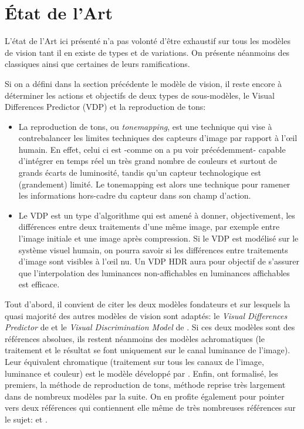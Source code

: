 	\chapter{État de l'Art}
	\par L'état de l'Art ici présenté n'a pas volonté d'être exhaustif sur tous les modèles de vision tant il en existe de types et de variations. On présente néanmoins des classiques ainsi que certaines de leurs ramifications.
	
	\par Si on a défini dans la section précédente le modèle de vision, il reste encore à déterminer les actions et objectifs de deux types de sous-modèles, le Visual Differences Predictor (VDP) et la reproduction de tons:
	\begin{itemize}
		\item La reproduction de tons, ou \textit{tonemapping}, est une technique qui vise à contrebalancer les limites techniques des capteurs d'image par rapport à l'œil humain. En effet, celui ci est -comme on a pu voir précédemment- capable d'intégrer en temps réel un très grand nombre de couleurs et surtout de grands écarts de luminosité, tandis qu'un capteur technologique est (grandement) limité. Le tonemapping est alors une technique pour ramener les informations hors-cadre du capteur dans son champ d'action.
		\item Le VDP est un type d'algorithme qui est amené à donner, objectivement, les différences entre deux traitements d'une même image, par exemple entre l'image initiale et une image après compression. Si le VDP est modélisé sur le système visuel humain, on pourra savoir si les différences entre traitements d'image sont visibles à l'œil nu. Un VDP HDR aura pour objectif de s'assurer que l'interpolation des luminances non-affichables en luminances affichables est efficace.
	\end{itemize}
	
	\par Tout d'abord, il convient de citer les deux modèles fondateurs et sur lesquels la quasi majorité des autres modèles de vision sont adaptés: le \textit{Visual Differences Predictor} de \citep{daly_visible_1992} et le \textit{Visual Discrimination Model} de \citep{lubin_visual_1995}. Si ces deux modèles sont des références absolues, ils restent néanmoins des modèles achromatiques (le traitement et le résultat se font uniquement sur le canal luminance de l'image). Leur équivalent chromatique (traitement sur tous les canaux de l'image, luminance et couleur) est le modèle développé par \citep{pattanaik_multiscale_1998}. Enfin, \citep{rushmeier_comparing_1995} ont formalisé, les premiers, la méthode de reproduction de tons, méthode reprise très largement dans de nombreux modèles par la suite. On en profite également pour pointer vers deux références qui contiennent elle même de très nombreuses références sur le sujet: \citep{moreau_traite_2006} et \citep{bradley_wavelet_1999}.
	
